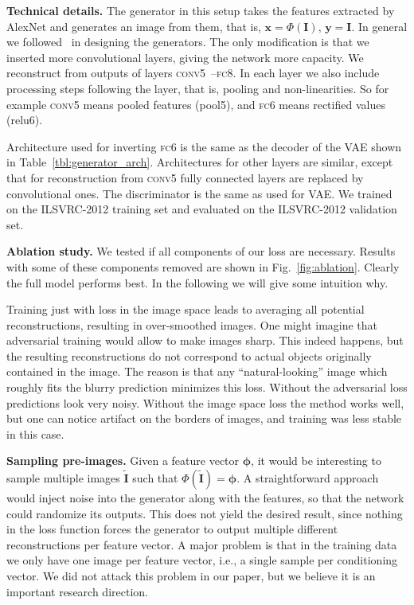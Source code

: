 \documentclass{article}
\newcommand{\conv}{\textsc{conv}}
\newcommand{\fc}{\textsc{fc}}
\newcommand{\inp}{\mathbf{x}}
\newcommand{\targ}{\mathbf{y}}
\newcommand{\img}{\mathbf{I}}
\newcommand{\feat}{\mathbf{\phi}}
\newcommand{\recimg}{\widetilde{\img}}
\newcommand{\repres}{\Phi}
\begin{document}
\textbf{Technical details.}
The generator in this setup takes the features extracted by AlexNet and generates an image from them, that is, $\inp = \repres(\img),\, \targ = \img$.
In general we followed~\citet{our_inverting} in designing the generators.
The only modification is that we inserted more convolutional layers, giving the network more capacity.
We reconstruct from outputs of layers \conv5~--\fc8.
In each layer we also include processing steps following the layer, that is, pooling and non-linearities. 
So for example \conv5 means pooled features (pool5), and \fc6 means rectified values (relu6).

Architecture used for inverting \fc6 is the same as the decoder of the VAE shown in Table~\ref{tbl:generator_arch}.
Architectures for other layers are similar, except that for reconstruction from \conv5 fully connected layers are replaced by convolutional ones. 
The discriminator is the same as used for VAE.
We trained on the ILSVRC-2012 training set and evaluated on the ILSVRC-2012 validation set.

\textbf{Ablation study.}
We tested if all components of our loss are necessary.
Results with some of these components removed are shown in Fig.~\ref{fig:ablation}.
Clearly the full model performs best. In the following we will give some intuition why.

Training just with loss in the image space leads to averaging all potential reconstructions, resulting in over-smoothed images.
One might imagine that adversarial training would allow to make images sharp.
This indeed happens, but the resulting reconstructions do not correspond to actual objects originally contained in the image.
The reason is that any ``natural-looking'' image which roughly fits the blurry prediction minimizes this loss.
Without the adversarial loss predictions look very noisy.
Without the image space loss the method works well, but one can notice artifact on the borders of images, and training was less stable in this case.

\textbf{Sampling pre-images.}
Given a feature vector $\feat$, it would be interesting to sample multiple images $\recimg$ such that $\repres(\recimg) = \feat$.
A straightforward approach would inject noise into the generator along with the features, so that the network could randomize its outputs.
This does not yield the desired result, since nothing in the loss function forces the generator to output multiple different reconstructions per feature vector.
A major problem is that in the training data we only have one image per feature vector, i.e., a single sample per conditioning vector.
We did not attack this problem in our paper, but we believe it is an important research direction.
\end{document}
